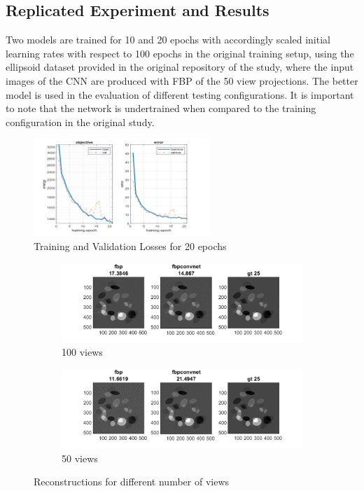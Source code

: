 \documentclass[journal, onecolumn, 11pt]{IEEEtran}
\begin{document}
\clearpage

\subsection{Replicated Experiment and Results} \label{subsec:training}

Two models are trained for 10 and 20 epochs with accordingly scaled initial learning rates with respect to 100 epochs in the original training setup, using the ellipsoid dataset provided in the original repository of the study, where the input images of the CNN are produced with FBP of the 50 view projections. The better model is used in the evaluation of different testing configurations. It is important to note that the network is undertrained when compared to the training configuration in the original study. 

\begin{figure}[h]
\centering
\includegraphics[width=0.6\textwidth]{images/training.png}
\caption{Training and Validation Losses for 20 epochs}\label{fig:training}
\end{figure}


\begin{figure}[h]
\centering
\begin{subfigure}[b]{0.8\linewidth}
\centering
\includegraphics[width=\textwidth]{images/reprec10.png}
\caption{100 views}\label{subfig:2a}
\end{subfigure}
\begin{subfigure}[b]{0.8\linewidth}
\centering
\includegraphics[width=\textwidth]{images/reprec20.png}
\caption{50 views}\label{subfig:2b}
\end{subfigure}
\caption{Reconstructions for different number of views}
\label{fig:reprecs}
\end{figure}
\end{document}

